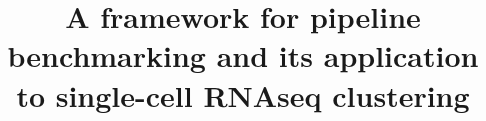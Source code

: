 \documentclass{bmcart}
\begin{document}
\begin{frontmatter}

\begin{fmbox}


\title{A framework for pipeline benchmarking and its application to single-cell RNAseq clustering}


\author[
   addressref={aff1,aff2},          %
   email={pierre-luc.germain@hest.ethz.ch}   %
]{ }
\author[
   addressref={aff1},
    email={anthony.sonrel@uzh.ch}
]{ }
\author[
   addressref={aff1},
   corref={aff1},                   %
   email={mark.robinson@imls.uzh.ch}
]{ }


\address[id=aff1]{
  , %
  ,
  ,
}
\address[id=aff2]{
  ,
  ,
  ,
}


\end{fmbox}
\end{frontmatter}
\end{document}
